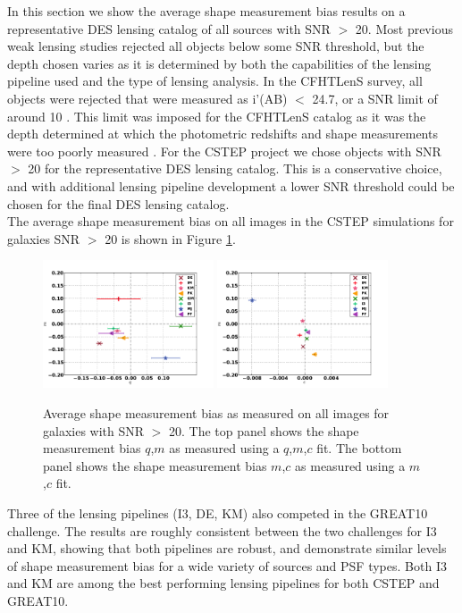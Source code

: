 In this section we show the average shape measurement 
bias results on a representative DES lensing catalog of 
all sources with SNR $>$ 20. Most previous weak lensing studies 
rejected all objects below some SNR threshold, but the 
depth chosen varies as it is determined by both the capabilities 
of the lensing pipeline used and the type of lensing analysis. In 
the CFHTLenS survey, all objects were rejected that were
measured as i'(AB) $<$ 24.7, or a SNR limit of around 10
\citep{cfhtls}. This limit was imposed for the CFHTLenS
catalog as it was the depth determined at which the 
photometric redshifts and shape measurements were too
poorly measured \citep{Hild}. For the CSTEP project
we chose objects with SNR $>$ 20 for the representative DES 
lensing catalog. This is a conservative choice, and 
with additional lensing pipeline development a lower
SNR threshold could be chosen for the final DES 
lensing catalog. \\

The average shape measurement bias on all images 
in the CSTEP simulations for galaxies SNR $>$ 20
is shown in Figure \ref{fig:QMC}. 
\begin{figure}
 \centering  %
  \includegraphics[width=0.45\textwidth]{fig/QMC_main_f.pdf} 
  \includegraphics[width=0.45\textwidth]{fig/MC_main_f.pdf} 
  \caption{Average shape measurement bias
as measured on all images for galaxies with SNR $>$ 20. The
top panel shows the shape measurement bias $q$,$m$ as measured using 
a $q$,$m$,$c$ fit. The bottom panel shows the shape measurement bias 
$m$,$c$ as measured using a $m$,$c$ fit.}
\label{fig:QMC}
\end{figure}
Three of the lensing pipelines (I3, DE, KM) also competed in the GREAT10 challenge.
The results are roughly consistent between
the two challenges for I3 and KM, showing that both pipelines are 
robust, and demonstrate similar levels of shape measurement bias
for a wide variety of sources and PSF types. Both I3 and KM are 
among the best performing lensing pipelines for both CSTEP and
GREAT10. 


